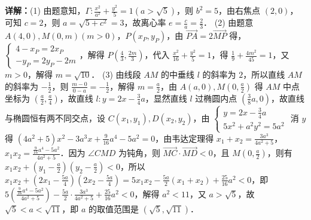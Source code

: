 \begin{question}[points=18]
\begin{solution}
\textbf{详解：}(1) 由题意知，$\Gamma: \frac{x^2}{a^2} + \frac{y^2}{5} = 1 (a > \sqrt{5})$，则 $b^2 = 5$，由右焦点 $(2,0)$，可知 $c = 2$，则 $a = \sqrt{5 + c^2} = 3$，故离心率 $e = \frac{c}{a} = \frac{2}{3}$．
(2) 由题意 $A(4,0), M(0, m) (m > 0)$，$P(x_P, y_P)$，由 $\overrightarrow{PA} = 2\overrightarrow{MP}$ 得，$\begin{cases} 4 - x_P = 2x_P \\ -y_P = 2y_P - 2m \end{cases}$，解得 $P\left(\frac{4}{3}, \frac{2m}{3}\right)$，代入 $\frac{x^2}{16} + \frac{y^2}{5} = 1$，得 $\frac{1}{9} + \frac{4m^2}{45} = 1$，又 $m > 0$，解得 $m = \sqrt{10}$．
(3) 由线段 $AM$ 的中垂线 $l$ 的斜率为 $2$，所以直线 $AM$ 的斜率为 $-\frac{1}{2}$，则 $\frac{m-0}{0-a} = -\frac{1}{2}$，解得 $m = \frac{a}{2}$，由 $A(a,0), M(0, \frac{a}{2})$ 得 $AM$ 中点坐标为 $(\frac{a}{2}, \frac{a}{4})$，故直线 $l: y = 2x - \frac{3}{4}a$，显然直线 $l$ 过椭圆内点 $(\frac{3}{8}a, 0)$，故直线与椭圆恒有两不同交点，设 $C(x_1, y_1), D(x_2, y_2)$，由 $\begin{cases} y = 2x - \frac{3}{4}a \\ 5x^2 + a^2 y^2 = 5a^2 \end{cases}$ 消 $y$ 得 $(4a^2 + 5)x^2 - 3a^3 x + \frac{9}{16}a^4 - 5a^2 = 0$，由韦达定理得 $x_1 + x_2 = \frac{3a^3}{4a^2 + 5}$，$x_1 x_2 = \frac{\frac{9}{16}a^4 - 5a^2}{4a^2 + 5}$．因为 $\angle CMD$ 为钝角，则 $\overrightarrow{MC} \cdot \overrightarrow{MD} < 0$，且 $M(0, \frac{a}{2})$，则有 $x_1 x_2 + (y_1 - \frac{a}{2})(y_2 - \frac{a}{2}) < 0$，所以 $x_1 x_2 + \left(2x_1 - \frac{5a}{4}\right)\left(2x_2 - \frac{5a}{4}\right) = 5x_1 x_2 - \frac{5a}{2}(x_1 + x_2) + \frac{25}{16}a^2 < 0$，即 $5\left(\frac{\frac{9}{16}a^4 - 5a^2}{4a^2 + 5}\right) - \frac{5a}{2} \cdot \frac{3a^3}{4a^2 + 5} + \frac{25}{16}a^2 < 0$，解得 $a^2 < 11$，又 $a > \sqrt{5}$，故 $\sqrt{5} < a < \sqrt{11}$，即 $a$ 的取值范围是 $(\sqrt{5}, \sqrt{11})$．
\end{solution}
\end{question}

